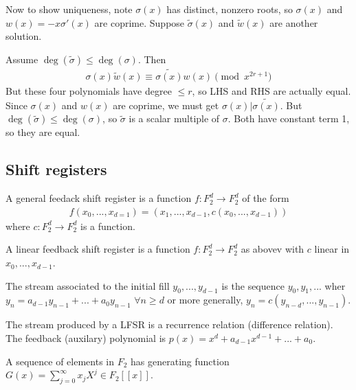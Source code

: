 \documentclass[a4paper]{article}
\begin{document}
Now to show uniqueness, note $\sigma(x)$ has distinct, nonzero roots, so $\sigma(x)$ and $w(x) = -x\sigma'(x)$ are coprime. Suppose $\tilde{\sigma}(x)$ and $\tilde{w}(x)$ are another solution.

Assume $\deg(\tilde{\sigma}) \leq \deg(\sigma)$. Then
\begin{equation*}
\begin{aligned}
\sigma(x) \tilde{w}(x) \equiv \tilde{\sigma(x)} w(x) \pmod {x^{2r+1}}
\end{aligned}
\end{equation*}
But these four polynomials have degree $\leq r$, so LHS and RHS are actually equal. Since $\sigma(x)$ and $w(x)$ are coprime, we must get $\sigma(x) | \tilde{\sigma(x)}$. But $\deg(\tilde{\sigma}) \leq \deg(\sigma)$, so $\tilde{\sigma}$ is a scalar multiple of $\sigma$. Both have constant term 1, so they are equal.

\subsection{Shift registers}
\begin{defi}
A general feedack shift register is a function $f:F_2^d \to F_2^d$ of the form
\begin{equation*}
\begin{aligned}
f(x_0,...,x_{d=1}) = (x_1,...,x_{d-1},c(x_0,...,x_{d-1}))
\end{aligned}
\end{equation*}
where $c:F_2^d \to F_2^d$ is a function.
\end{defi}

\begin{defi}
A linear feedback shift register is a function $f:F_2^d \to F_2^d$ as abovev with $c$ linear in $x_0,...,x_{d-1}$.
\end{defi}

The stream associated to the initial fill $y_0,...,y_{d-1}$ is the sequence $y_0,y_1,...$ wher $y_n = a_{d-1} y_{n-1} + ... + a_0 y_{n-1}$ $\forall n \geq d$ or more generally, $y_n = c(y_{n-d},...,y_{n-1})$.

The stream produced by a LFSR is a recurrence relation (difference relation). The feedback (auxilary) polynomial is $p(x) = x^d+a_{d-1} x^{d-1} + ... + a_0$.

\begin{defi}
A sequence of elements in $F_2$ has generating function $G(x) = \sum_{j=0}^\infty x_j X^j \in F_2[[x]]$.
\end{defi}
\end{document}
